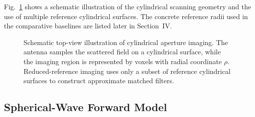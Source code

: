 \documentclass[journal]{IEEEtran}
\begin{document}
Fig.~\ref{fig:cylindrical_geometry} shows a schematic illustration of the cylindrical scanning geometry and the use of multiple reference cylindrical surfaces. The concrete reference radii used in the comparative baselines are listed later in Section~IV.

\begin{figure}[!t]
\centering
{}
\caption{Schematic top-view illustration of cylindrical aperture imaging. The antenna samples the scattered field on a cylindrical surface, while the imaging region is represented by voxels with radial coordinate \(\rho\). Reduced-reference imaging uses only a subset of reference cylindrical surfaces to construct approximate matched filters.}
\label{fig:cylindrical_geometry}
\end{figure}

\subsection{Spherical-Wave Forward Model}
\label{subsec:forward_model}
\end{document}
